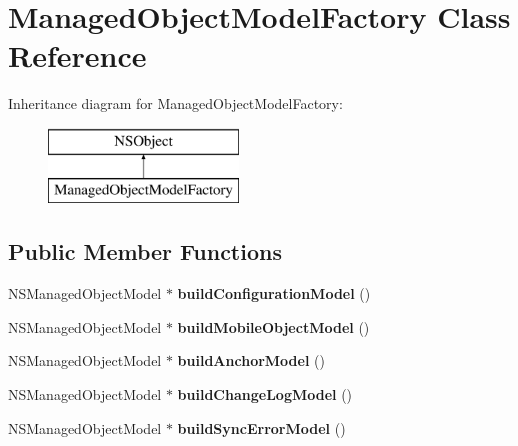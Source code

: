 \hypertarget{interface_managed_object_model_factory}{
\section{\-Managed\-Object\-Model\-Factory \-Class \-Reference}
\label{interface_managed_object_model_factory}
}
\-Inheritance diagram for \-Managed\-Object\-Model\-Factory\-:\begin{figure}[H]
\begin{center}
\leavevmode
\includegraphics[height=2.000000cm]{interface_managed_object_model_factory}
\end{center}
\end{figure}
\subsection*{\-Public \-Member \-Functions}
\begin{DoxyCompactItemize}
\item 
\hypertarget{interface_managed_object_model_factory_a23a5d2699e4d871ed791791659381e7c}{
\-N\-S\-Managed\-Object\-Model $\ast$ {\bfseries build\-Configuration\-Model} ()}
\label{interface_managed_object_model_factory_a23a5d2699e4d871ed791791659381e7c}

\item 
\hypertarget{interface_managed_object_model_factory_a3346fcdf7a35b8d62023a658e9f9877e}{
\-N\-S\-Managed\-Object\-Model $\ast$ {\bfseries build\-Mobile\-Object\-Model} ()}
\label{interface_managed_object_model_factory_a3346fcdf7a35b8d62023a658e9f9877e}

\item 
\hypertarget{interface_managed_object_model_factory_a4999b31d18371a68f4f73389e8fdcfdd}{
\-N\-S\-Managed\-Object\-Model $\ast$ {\bfseries build\-Anchor\-Model} ()}
\label{interface_managed_object_model_factory_a4999b31d18371a68f4f73389e8fdcfdd}

\item 
\hypertarget{interface_managed_object_model_factory_aacdba9169dc11770a03706dd023fa5f9}{
\-N\-S\-Managed\-Object\-Model $\ast$ {\bfseries build\-Change\-Log\-Model} ()}
\label{interface_managed_object_model_factory_aacdba9169dc11770a03706dd023fa5f9}

\item 
\hypertarget{interface_managed_object_model_factory_ac9ac945bfae6b30af5a622e3906957c2}{
\-N\-S\-Managed\-Object\-Model $\ast$ {\bfseries build\-Sync\-Error\-Model} ()}
\label{interface_managed_object_model_factory_ac9ac945bfae6b30af5a622e3906957c2}

\end{DoxyCompactItemize}
